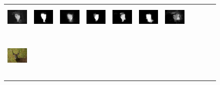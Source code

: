 \documentclass[10pt,twocolumn,letterpaper]{article}
\begin{document}
\begin{figure}
\begin{tabular}{@{}c@{}c@{}c@{}c@{}c@{}c@{}c@{}c@{}c@{}c@{}c}
\includegraphics[width=0.085\linewidth,height=1.25cm]{0216_DCL.png} \ &
\includegraphics[width=0.085\linewidth,height=1.25cm]{0216_DHS.png} \ &
\includegraphics[width=0.085\linewidth,height=1.25cm]{0216_DS.png} \ &
\includegraphics[width=0.085\linewidth,height=1.25cm]{0216_LEGS.png} \ &
\includegraphics[width=0.085\linewidth,height=1.25cm]{0216_MDF.png} \ &
\includegraphics[width=0.085\linewidth,height=1.25cm]{0216_ELD.png} \ &
\includegraphics[width=0.085\linewidth,height=1.25cm]{0216_DRFI.png} \ \\
\vspace{-1mm}
\includegraphics[width=0.085\linewidth,height=1.25cm]{0142.jpg} \ &

\end{tabular}
\end{figure}
\end{document}
